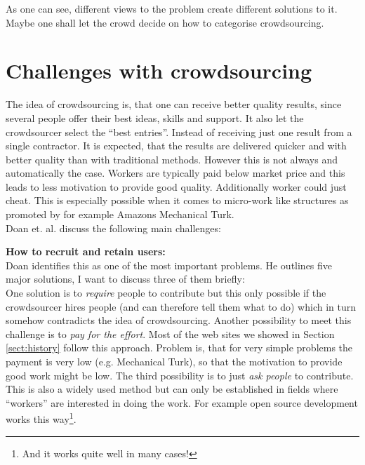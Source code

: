 \documentclass{acm_proc_article-sp}
\begin{document}
As one can see, different views to the problem create different solutions to it. Maybe one shall let the crowd decide on how to categorise crowdsourcing.

\section{Challenges with crowdsourcing}
\label{sect:problems}
The idea of crowdsourcing is, that one can receive better quality results, since several people offer their best ideas, skills and support. It also let the crowdsourcer select the ``best entries''. Instead of receiving just one result from a single contractor. It is expected, that the results are delivered quicker and with better quality than with traditional methods. However this is not always and automatically the case. Workers are typically paid below market price and this leads to less motivation to provide good quality. Additionally worker could just cheat. This is especially possible when it comes to micro-work like structures as promoted by for example Amazons Mechanical Turk.\\
Doan et. al. discuss the following main challenges\cite{doan:crowd}:

\textbf{How to recruit and retain users: }\\
Doan identifies this as one of the most important problems. He outlines five major solutions, I want to discuss three of them briefly:\\
One solution is to \textit{require} people to contribute but this only possible if the crowdsourcer hires people (and can therefore tell them what to do) which in turn somehow contradicts the idea of crowdsourcing. Another possibility to meet this challenge is to \textit{pay for the effort}. Most of the web sites we showed in Section \ref{sect:history} follow this approach. Problem is, that for very simple problems the payment is very low (e.g. Mechanical Turk), so that the motivation to provide good work might be low. The third possibility is to just \textit{ask people} to contribute. This is also a widely used method but can only be established in fields where ``workers'' are interested in doing the work. For example open source development works this way\footnote{And it works quite well in many cases!}.
\end{document}
